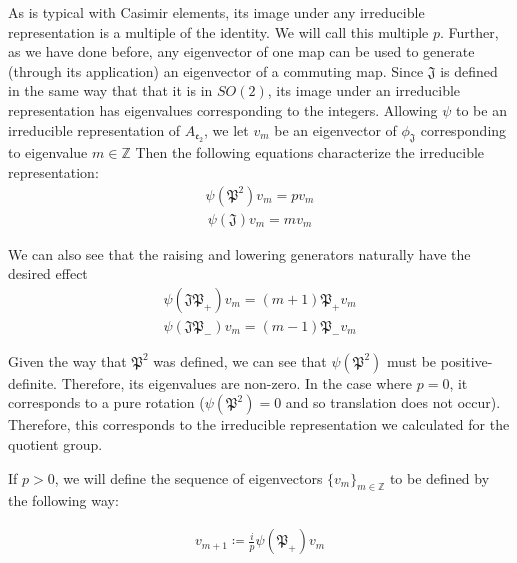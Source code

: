 \documentclass[10pt]{ucthesis}
\newcommand{\Z}{\mathbb{Z}}
\begin{document}
As is typical with Casimir elements, its image under any irreducible representation is a multiple of the identity. We will call this multiple $p$. Further, as we have done before, any eigenvector of one map can be used to generate (through its application) an eigenvector of a commuting map. Since $\mathfrak{J}$ is defined in the same way that that it is in $SO(2)$, its image under an irreducible representation has eigenvalues corresponding to the integers. Allowing $\psi$ to be an irreducible representation of $A_\mathfrak{e_2}$, we let $v_m$ be an eigenvector of $\phi_\mathfrak{J}$ corresponding to eigenvalue $m\in\Z$ Then the following equations characterize the irreducible representation:
\begin{equation}
\begin{aligned}
	 \psi(\mathfrak{P}^2)v_m = pv_m
\end{aligned}
\end{equation}
\begin{equation}
\begin{aligned}
	 \psi(\mathfrak{J})v_m = mv_m
\end{aligned}
\end{equation}

We can also see that the raising and lowering generators naturally have the desired effect
\begin{equation}
\begin{aligned}
	 \psi(\mathfrak{J}\mathfrak{P}_+)v_m = (m+1)\mathfrak{P}_+v_m
\end{aligned}
\end{equation}
\begin{equation}
\begin{aligned}
	 \psi(\mathfrak{J}\mathfrak{P}_-)v_m = (m-1)\mathfrak{P}_-v_m
\end{aligned}
\end{equation}

Given the way that $\mathfrak{P}^2$ was defined, we can see that $\psi(\mathfrak{P}^2)$ must be positive-definite. Therefore, its eigenvalues are non-zero. In the case where $p=0$, it corresponds to a pure rotation ($\psi(\mathfrak{P}^2) = 0$ and so translation does not occur). Therefore, this corresponds to the irreducible representation we calculated for the quotient group. 

If $p>0$, we will define the sequence of eigenvectors $\{v_m\}_{m\in\Z}$ to be defined by the following way:

\begin{equation}
\begin{aligned}
	 v_{m+1} \coloneq \frac{i}{p}\psi(\mathfrak{P}_+)v_m
\end{aligned}
\end{equation}
\end{document}
